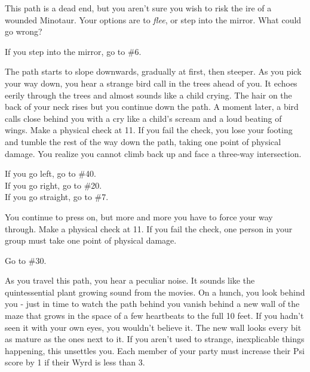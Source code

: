 \documentclass[green]{gl2018}
\begin{document}
\begin{large}
\begin{location}{16}
This path is a dead end, but you aren't sure you wish to risk the ire of a wounded Minotaur. Your options are to \emph{flee}, or step into the mirror. What could go wrong?

\begin{fromhere}
   If you step into the mirror, go to \#6.\\
\end{fromhere}

\end{location}
\begin{location}{17}
The path starts to slope downwards, gradually at first, then steeper.  As you pick your way down, you hear a strange bird call in the trees ahead of you.  It echoes eerily through the trees and almost sounds like a child crying.  The hair on the back of your neck rises but you continue down the path.  A moment later, a bird calls close behind you with a cry like a child’s scream and a loud beating of wings.  Make a physical check at 11.  If you fail the check, you lose your footing and tumble the rest of the way down the path, taking one point of physical damage.  You realize you cannot climb back up and face a three-way intersection.  
\begin{fromhere}
If you go left, go to \#40.\\
  If you go right, go to \#20.\\
  If you go straight, go to \#7.\\
\end{fromhere}
\end{location}
\begin{location}{18}
You continue to press on, but more and more you have to force your way through. Make a physical check at 11. If you fail the check, one person in your group must take one point of physical damage. 
\begin{fromhere}Go to \#30.\end{fromhere}
\end{location}
\begin{location}{19}
As you travel this path, you hear a peculiar noise. It sounds like the quintessential plant growing sound from the movies. On a hunch, you look behind you - just in time to watch the path behind you vanish behind a new wall of the maze that grows in the space of a few heartbeats to the full 10 feet. If you hadn't seen it with your own eyes, you wouldn't believe it. The new wall looks every bit as mature as the ones next to it. If you aren't used to strange, inexplicable things happening, this unsettles you.  Each member of your party must increase their Psi score by 1 if their Wyrd is less than 3.

\end{location}
\end{large}
\end{document}
